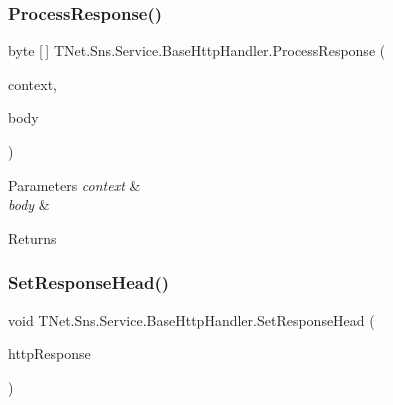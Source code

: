 \subsubsection{\texorpdfstring{Process\+Response()}{ProcessResponse()}\hspace{0.1cm}{\footnotesize\ttfamily [2/2]}}
{\footnotesize\ttfamily byte \mbox{[}$\,$\mbox{]} T\+Net.\+Sns.\+Service.\+Base\+Http\+Handler.\+Process\+Response (\begin{DoxyParamCaption}\item[{I\+Http\+Request\+Context}]{context,  }\item[{\mbox{\hyperlink{class_t_net_1_1_sns_1_1_service_1_1_response_body}{Response\+Body}}}]{body }\end{DoxyParamCaption})\hspace{0.3cm}{\ttfamily [protected]}}






\begin{DoxyParams}{Parameters}
{\em context} & \\
\hline
{\em body} & \\
\hline
\end{DoxyParams}
\begin{DoxyReturn}{Returns}

\end{DoxyReturn}
\mbox{\label{class_t_net_1_1_sns_1_1_service_1_1_base_http_handler_a2bdf1ead4d4eabcb1cccd47aee01819a}} 
\subsubsection{\texorpdfstring{Set\+Response\+Head()}{SetResponseHead()}}
{\footnotesize\ttfamily void T\+Net.\+Sns.\+Service.\+Base\+Http\+Handler.\+Set\+Response\+Head (\begin{DoxyParamCaption}\item[{Http\+Response}]{http\+Response }\end{DoxyParamCaption})\hspace{0.3cm}{\ttfamily [protected]}}







